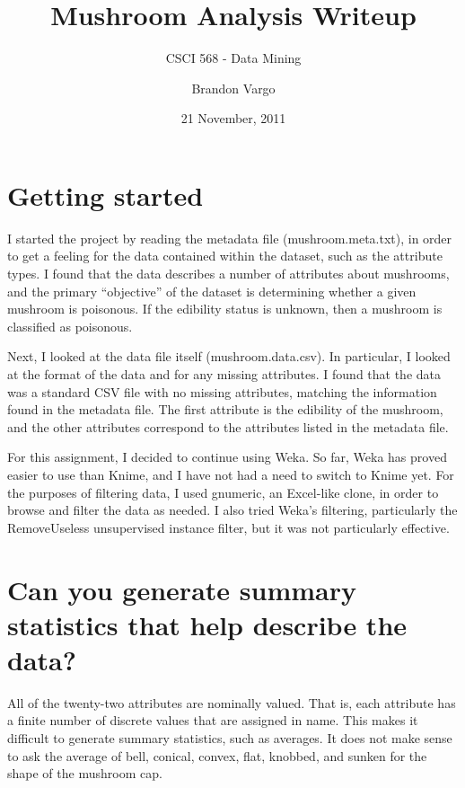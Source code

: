 \documentclass[margin,letterpaper,11pt]{scrartcl}
\begin{document}
\setlength{\pdfpageheight}{\paperheight}
\setlength{\pdfpagewidth}{\paperwidth}

\title{Mushroom Analysis Writeup}
\subtitle{CSCI 568 - Data Mining}
\date{21 November, 2011}
\author{Brandon Vargo}
\maketitle

\section{Getting started}

I started the project by reading the metadata file (mushroom.meta.txt), in
order to get a feeling for the data contained within the dataset, such as the
attribute types. I found that the data describes a number of attributes about
mushrooms, and the primary ``objective'' of the dataset is determining whether
a given mushroom is poisonous. If the edibility status is unknown, then a
mushroom is classified as poisonous.

Next, I looked at the data file itself (mushroom.data.csv). In particular, I
looked at the format of the data and for any missing attributes. I found that
the data was a standard CSV file with no missing attributes, matching the
information found in the metadata file. The first attribute is the edibility
of the mushroom, and the other attributes correspond to the attributes listed
in the metadata file.

For this assignment, I decided to continue using Weka. So far, Weka has proved
easier to use than Knime, and I have not had a need to switch to Knime yet. For
the purposes of filtering data, I used gnumeric, an Excel-like clone, in order
to browse and filter the data as needed. I also tried Weka's filtering,
particularly the RemoveUseless unsupervised instance filter, but it was not
particularly effective.

\section{Can you generate summary statistics that help describe the data?}

All of the twenty-two attributes are nominally valued. That is, each attribute
has a finite number of discrete values that are assigned in name. This makes
it difficult to generate summary statistics, such as averages. It does not
make sense to ask the average of bell, conical, convex, flat, knobbed, and
sunken for the shape of the mushroom cap.
\end{document}
